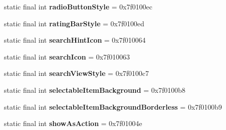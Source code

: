 \begin{DoxyCompactItemize}
\item 
\hypertarget{classandroid_1_1support_1_1v7_1_1appcompat_1_1_r_1_1attr_a201b7913a0de817ec30acd0691d2625e}{}static final int {\bfseries radio\+Button\+Style} = 0x7f0100ec\label{classandroid_1_1support_1_1v7_1_1appcompat_1_1_r_1_1attr_a201b7913a0de817ec30acd0691d2625e}

\item 
\hypertarget{classandroid_1_1support_1_1v7_1_1appcompat_1_1_r_1_1attr_ab991f58e144af354b99b3106d5d02d7d}{}static final int {\bfseries rating\+Bar\+Style} = 0x7f0100ed\label{classandroid_1_1support_1_1v7_1_1appcompat_1_1_r_1_1attr_ab991f58e144af354b99b3106d5d02d7d}

\item 
\hypertarget{classandroid_1_1support_1_1v7_1_1appcompat_1_1_r_1_1attr_a2688f75cc82640a8a704fa001d332fb2}{}static final int {\bfseries search\+Hint\+Icon} = 0x7f010064\label{classandroid_1_1support_1_1v7_1_1appcompat_1_1_r_1_1attr_a2688f75cc82640a8a704fa001d332fb2}

\item 
\hypertarget{classandroid_1_1support_1_1v7_1_1appcompat_1_1_r_1_1attr_ad99268414f1929044a1f84bf8d51ee0c}{}static final int {\bfseries search\+Icon} = 0x7f010063\label{classandroid_1_1support_1_1v7_1_1appcompat_1_1_r_1_1attr_ad99268414f1929044a1f84bf8d51ee0c}

\item 
\hypertarget{classandroid_1_1support_1_1v7_1_1appcompat_1_1_r_1_1attr_ab9b2ec7d0b89ab5a4ffe58337bcfcc12}{}static final int {\bfseries search\+View\+Style} = 0x7f0100c7\label{classandroid_1_1support_1_1v7_1_1appcompat_1_1_r_1_1attr_ab9b2ec7d0b89ab5a4ffe58337bcfcc12}

\item 
\hypertarget{classandroid_1_1support_1_1v7_1_1appcompat_1_1_r_1_1attr_a18a24684eaf9f44da2f89509089239bc}{}static final int {\bfseries selectable\+Item\+Background} = 0x7f0100b8\label{classandroid_1_1support_1_1v7_1_1appcompat_1_1_r_1_1attr_a18a24684eaf9f44da2f89509089239bc}

\item 
\hypertarget{classandroid_1_1support_1_1v7_1_1appcompat_1_1_r_1_1attr_abdee90dc895f59172d94407f95904b04}{}static final int {\bfseries selectable\+Item\+Background\+Borderless} = 0x7f0100b9\label{classandroid_1_1support_1_1v7_1_1appcompat_1_1_r_1_1attr_abdee90dc895f59172d94407f95904b04}

\item 
\hypertarget{classandroid_1_1support_1_1v7_1_1appcompat_1_1_r_1_1attr_a3c7edd0cae5923177e32940fd0dcd3e0}{}static final int {\bfseries show\+As\+Action} = 0x7f01004e\label{classandroid_1_1support_1_1v7_1_1appcompat_1_1_r_1_1attr_a3c7edd0cae5923177e32940fd0dcd3e0}


\end{DoxyCompactItemize}
